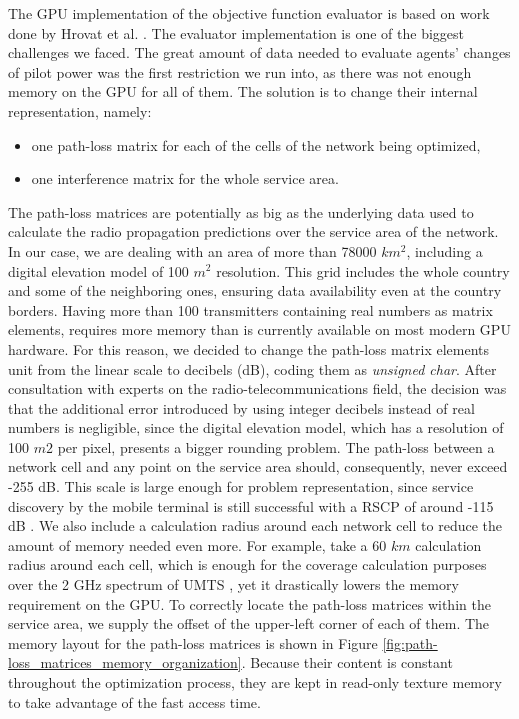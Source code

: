 The GPU implementation of the objective function evaluator is based
on work done by Hrovat et al. \cite{Ozimek_Open.source.radio.coverage.prediction:2010}.
The evaluator implementation is one of the biggest challenges we faced.
The great amount of data needed to evaluate agents' changes of pilot
power was the first restriction we run into, as there was not enough
memory on the GPU for all of them. The solution is to change their
internal representation, namely:
\begin{itemize}
\item one path-loss matrix for each of the cells of the network being optimized,
\item one interference matrix for the whole service area.
\end{itemize}
The path-loss matrices are potentially as big as the underlying data
used to calculate the radio propagation predictions over the service
area of the network. In our case, we are dealing with an area of more
than 78000 $km^{2}$, including a digital elevation model of 100 $m^{2}$
resolution. This grid includes the whole country and some of the neighboring
ones, ensuring data availability even at the country borders. Having
more than 100 transmitters containing real numbers as matrix elements,
requires more memory than is currently available on most modern GPU
hardware. For this reason, we decided to change the path-loss matrix
elements unit from the linear scale to decibels (dB), coding them
as \emph{unsigned char}. After consultation with experts on the radio-telecommunications
field, the decision was that the additional error introduced by using
integer decibels instead of real numbers is negligible, since the
digital elevation model, which has a resolution of 100 $m2$ per pixel,
presents a bigger rounding problem. The path-loss between a network
cell and any point on the service area should, consequently, never
exceed -255 dB. This scale is large enough for problem representation,
since service discovery by the mobile terminal is still successful
with a RSCP of around -115 dB \cite{Holma_WCDMA.for.UMTS:2005}. We
also include a calculation radius around each network cell to reduce
the amount of memory needed even more. For example, take a 60 $km$
calculation radius around each cell, which is enough for the coverage
calculation purposes over the 2 GHz spectrum of UMTS \cite{Holma_WCDMA.for.UMTS:2005},
yet it drastically lowers the memory requirement on the GPU. To correctly
locate the path-loss matrices within the service area, we supply the
offset of the upper-left corner of each of them. The memory layout
for the path-loss matrices is shown in Figure \ref{fig:path-loss_matrices_memory_organization}.
Because their content is constant throughout the optimization process,
they are kept in read-only texture memory to take advantage of the
fast access time.

